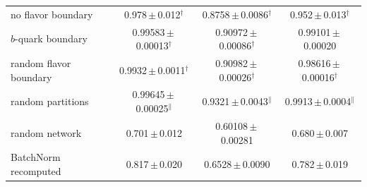 \begin{table}[t]
\begin{tabular*}{\linewidth}{@{\extracolsep{\fill}}lccc@{}}
\quad no flavor boundary & 0.978\,$\pm$\,0.012$^{\dagger}$ & 0.8758\,$\pm$\,0.0086$^{\dagger}$ & 0.952\,$\pm$\,0.013$^{\dagger}$ \\
\quad $b$-quark boundary & 0.99583\,$\pm$\,0.00013$^{\dagger}$ & 0.90972\,$\pm$\,0.00086$^{\dagger}$ & 0.99101\,$\pm$\,0.00020 \\
\quad random flavor boundary & 0.9932\,$\pm$\,0.0011$^{\dagger}$ & 0.90982\,$\pm$\,0.00026$^{\dagger}$ & 0.98616\,$\pm$\,0.00016$^{\dagger}$ \\
\quad random partitions & 0.99645\,$\pm$\,0.00025$^{\parallel}$ & 0.9321\,$\pm$\,0.0043$^{\parallel}$ & 0.9913\,$\pm$\,0.0004$^{\parallel}$ \\
random network & 0.701\,$\pm$\,0.012 & 0.60108\,$\pm$\,0.00281 & 0.680\,$\pm$\,0.007 \\
\quad BatchNorm recomputed & 0.817\,$\pm$\,0.020 & 0.6528\,$\pm$\,0.0090 & 0.782\,$\pm$\,0.019 \\
\bottomrule
\end{tabular*}
\end{table}
